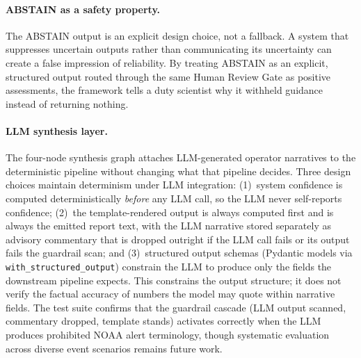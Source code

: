 \documentclass{article}
\begin{document}
\paragraph{ABSTAIN as a safety property.}
The ABSTAIN output is an explicit design choice, not a fallback.
A system that suppresses uncertain outputs rather than communicating
its uncertainty can create a false impression of reliability. By
treating ABSTAIN as an explicit, structured output routed through
the same Human Review Gate as positive assessments, the framework
tells a duty scientist why it withheld guidance instead of returning
nothing.

\paragraph{LLM synthesis layer.}
The four-node synthesis graph attaches LLM-generated operator
narratives to the deterministic pipeline without changing what that
pipeline decides. Three
design choices maintain determinism under LLM integration: (1)~system confidence
is computed deterministically \emph{before} any LLM call, so the
LLM never self-reports confidence; (2)~the template-rendered
output is always computed first and is always the emitted report
text, with the LLM narrative stored separately as advisory
commentary that is dropped outright if the LLM call fails or its
output fails the guardrail scan; and (3)~structured output
schemas (Pydantic models via
\texttt{with\_structured\_output}) constrain the LLM to produce
only the fields the downstream pipeline expects. This constrains
the output structure; it does not verify the factual accuracy of
numbers the model may quote within narrative fields.
The test suite confirms that the guardrail cascade (LLM output
scanned, commentary dropped, template stands) activates
correctly when the
LLM produces prohibited NOAA alert terminology, though systematic
evaluation across diverse event scenarios remains future work.
\end{document}

